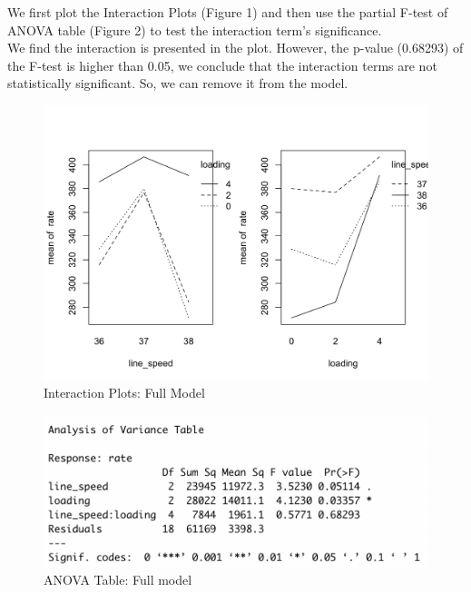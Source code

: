\documentclass[11pt,a4paper]{article}
\begin{document}
We first plot the Interaction Plots (Figure 1) and then use the partial F-test of ANOVA table (Figure 2) to test the interaction term's significance.\\
We find the interaction is presented in the plot. However, the p-value (0.68293) of the F-test is higher than 0.05, we conclude that the interaction terms are not statistically significant. So, we can remove it from the model.\\
\begin{figure}[htb]
    \centering
    \includegraphics[scale=0.3]{inter1.png}
    \caption{Interaction Plots: Full Model}
    \label{}
\end{figure}
\begin{figure}[htb]
    \centering
    \includegraphics[scale=0.8]{inter2.png}
    \caption{ANOVA Table: Full model}
    \label{}
\end{figure}
\end{document}
